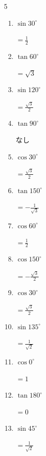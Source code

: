\begin{multicols}{5}
\begin{enumerate}
  \item $\displaystyle \sin{30^\circ}$

        $\displaystyle =\frac{1}{2}$

  \item $\displaystyle \tan{60^\circ}$

        $\displaystyle =\sqrt{3}$

\columnbreak %

  \item $\displaystyle \sin{120^\circ}$

        $\displaystyle =\frac{\sqrt{3}}{2}$

  \item $\displaystyle \tan{90^\circ}$

        $\displaystyle なし$

  \item $\displaystyle \cos{30^\circ}$

        $\displaystyle =\frac{\sqrt{3}}{2}$

  \item $\displaystyle \tan{150^\circ}$

        $\displaystyle =-\frac{1}{\sqrt{3}}$

  \item $\displaystyle \cos{60^\circ}$

        $\displaystyle =\frac{1}{2}$

  \item $\displaystyle \cos{150^\circ}$

        $\displaystyle =-\frac{\sqrt{3}}{2}$

  \item $\displaystyle \cos{30^\circ}$

        $\displaystyle =\frac{\sqrt{3}}{2}$

  \item $\displaystyle \sin{135^\circ}$

        $\displaystyle =\frac{1}{\sqrt{2}}$

  \item $\displaystyle \cos{0^\circ}$

        $\displaystyle =1$

  \item $\displaystyle \tan{180^\circ}$

        $\displaystyle =0$

  \item $\displaystyle \sin{45^\circ}$

        $\displaystyle =\frac{1}{\sqrt{2}}$


\end{enumerate}
\end{multicols}
